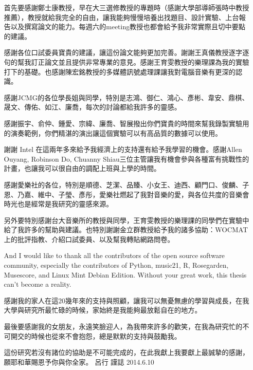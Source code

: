 \begin{acknowledgementsCH}

首先要感謝鄭士康教授，早在大三選修教授的專題時（感謝大學部導師張時中教授推薦），教授就給我完全的自由，讓我能夠慢慢培養出找題目、設計實驗、上台報告以及撰寫論文的能力。每週六的meeting教授也都會給予我非常實際且切中要點的建議。

感謝各位口試委員寶貴的建議，讓這份論文能夠更加完善。謝謝王真儀教授逐字逐句的幫我訂正論文並且提供非常專業的意見。感謝王育雯教授的樂理課為我的實驗打下的基礎。也感謝陳宏銘教授的多媒體訊號處理課讓我對電腦音樂有更深的認識。

感謝JCMG的各位學長姐與同學，特別是志鴻、御仁、鴻心、彥彬、韋安、鼎棋、晟文、傳佑、如江、廉喬，每次的討論都給我許多的靈感。

感謝振宇、俞仲、鍾愛、宗緯、廉喬、智展撥出你們寶貴的時間來幫我錄製實驗用的演奏範例，你們精湛的演出讓這個實驗可以有高品質的數據可以使用。

謝謝 Intel 在這兩年多來給予我經濟上的支持還有給予我學習的機會。感謝Allen Ouyang, Robinson Do, Chuanny Shiau三位主管讓我有機會參與各種富有挑戰性的計畫，也讓我可以很自由的調配上班與上學的時間。

感謝愛樂社的各位，特別是順德、芝潔、品臻、小女王、迪西、顧門口、俊麟、子恩、乃嘉、維中、子瑩、彥彤，愛樂社燃起了我對音樂的愛，與各位共度的音樂會時光也是經常是我研究的靈感來源。

另外要特別感謝台大音樂所的教授與同學，王育雯教授的樂理課的同學們在實驗中給了我許多的幫助與建議。也特別謝謝金立群教授給予我的諸多協助：WOCMAT上的批評指教、介紹口試委員、以及幫我轉貼網路問卷。

And I would like to thank all the contributors of the open source software community, especially the contributors of Python, music21, R, Rosegarden, Musescore, and Linux Mint Debian Edition. Without your great work, this thesis can't become a reality.

感謝我的家人在這20幾年來的支持與照顧，讓我可以無憂無慮的學習與成長，在我大學與研究所最忙碌的時候，家始終是我能夠最放鬆自在的地方。

最後要感謝我的女朋友，永遠笑臉迎人，為我帶來許多的歡笑，在我為研究忙的不可開交的時候也從來不會抱怨，總是默默的支持與鼓勵我。

這份研究若沒有諸位的協助是不可能完成的，在此我獻上我要獻上最誠摯的感謝，願耶和華賜恩予你與你全家。
   \flushright 呂行 謹誌 2014.6.10







\end{acknowledgementsCH}
